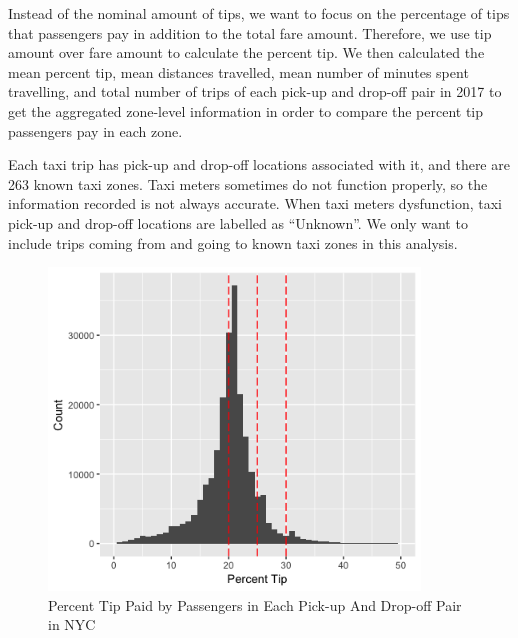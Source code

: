 \documentclass[12pt,twoside]{reedthesis}
\newenvironment{Shaded}{\begin{snugshade}}{\end{snugshade}}
\newcommand{\KeywordTok}[1]{\textcolor[rgb]{0.13,0.29,0.53}{\textbf{#1}}}
\newcommand{\DataTypeTok}[1]{\textcolor[rgb]{0.13,0.29,0.53}{#1}}
\newcommand{\DecValTok}[1]{\textcolor[rgb]{0.00,0.00,0.81}{#1}}
\newcommand{\StringTok}[1]{\textcolor[rgb]{0.31,0.60,0.02}{#1}}
\newcommand{\OperatorTok}[1]{\textcolor[rgb]{0.81,0.36,0.00}{\textbf{#1}}}
\newcommand{\NormalTok}[1]{#1}
\theoremstyle{definition}
\theoremstyle{definition}
\theoremstyle{definition}
\theoremstyle{remark}
\begin{document}
Instead of the nominal amount of tips, we want to focus on the
percentage of tips that passengers pay in addition to the total fare
amount. Therefore, we use tip amount over fare amount to calculate the
percent tip. We then calculated the mean percent tip, mean distances
travelled, mean number of minutes spent travelling, and total number of
trips of each pick-up and drop-off pair in 2017 to get the aggregated
zone-level information in order to compare the percent tip passengers
pay in each zone.
\begin{Shaded}
\end{Shaded}
Each taxi trip has pick-up and drop-off locations associated with it,
and there are 263 known taxi zones. Taxi meters sometimes do not
function properly, so the information recorded is not always accurate.
When taxi meters dysfunction, taxi pick-up and drop-off locations are
labelled as ``Unknown''. We only want to include trips coming from and
going to known taxi zones in this analysis.
\begin{figure}

{\centering \includegraphics[width=3.89in]{figure/region_vis} 

}

\caption{Percent Tip Paid by Passengers in Each Pick-up And Drop-off Pair in NYC}\label{fig:region-vis}
\end{figure}
\end{document}
